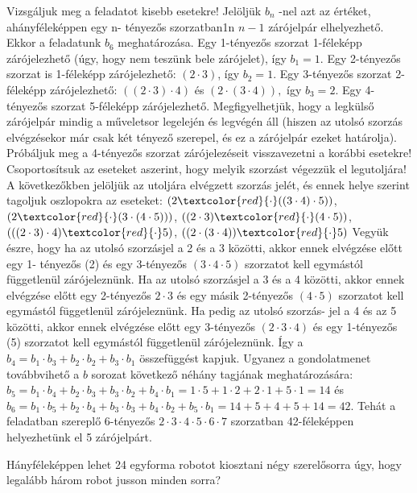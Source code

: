 \begin{solution}
Vizsgáljuk meg a feladatot kisebb esetekre! Jelöljük $b_{n}$ -nel
azt az értéket, ahányféleképpen egy n- tényezős szorzatban1n $n-1$
zárójelpár elhelyezhető. Ekkor a feladatunk $b_{6}$ meghatározása.
Egy 1-tényezős szorzat 1-féleképp zárójelezhető (úgy, hogy nem teszünk
bele zárójelet), így $b_{1}=1.$ Egy 2-tényezős szorzat is 1-féleképp
zárójelezhető: $(2\cdot3)$, így $b_{2}=1.$ Egy 3-tényezős szorzat
2-féleképp zárójelezhető: $((2\cdot3)\cdot4)$ és $(2\cdot(3\cdot4)),$
így $b_{3}=2.$ Egy 4-tényezős szorzat 5-féleképp zárójelezhető. Megfigyelhetjük,
hogy a legkülső zárójelpár mindig a műveletsor legelején és legvégén
áll (hiszen az utolsó szorzás elvégzésekor már csak két tényező szerepel,
és ez a zárójelpár ezeket határolja). Próbáljuk meg a 4-tényezős szorzat
zárójelezéseit visszavezetni a korábbi esetekre! Csoportosítsuk az
eseteket aszerint, hogy melyik szorzást végezzük el legutoljára! A
következőkben jelöljük az utoljára elvégzett szorzás jelét, és ennek
helye szerint tagoljuk oszlopokra az eseteket: $(2\textcolor{red}{\cdot}((3\cdot4)\cdot5))$,
$(2\textcolor{red}{\cdot}(3\cdot(4\cdot5)))$, $((2\cdot3)\textcolor{red}{\cdot}(4\cdot5))$,
$(((2\cdot3)\cdot4)\textcolor{red}{\cdot}5)$, $((2\cdot(3\cdot4))\textcolor{red}{\cdot}5)$
Vegyük észre, hogy ha az utolsó szorzásjel a 2 és a 3 közötti, akkor
ennek elvégzése előtt egy 1- tényezős (2) és egy 3-tényezős $(3\cdot4\cdot5)$
szorzatot kell egymástól függetlenül zárójeleznünk. Ha az utolsó szorzásjel
a 3 és a 4 közötti, akkor ennek elvégzése előtt egy 2-tényezős $2\cdot3$
és egy másik 2-tényezős $(4\cdot5)$ szorzatot kell egymástól függetlenül
zárójeleznünk. Ha pedig az utolsó szorzás- jel a 4 és az 5 közötti,
akkor ennek elvégzése előtt egy 3-tényezős $(2\cdot3\cdot4)$ és egy
1-tényezős (5) szorzatot kell egymástól függetlenül zárójeleznünk.
Így a $b_{4}=b_{1}\cdot b_{3}+b_{2}\cdot b_{2}+b_{3}\cdot b_{1}$
összefüggést kapjuk. Ugyanez a gondolatmenet továbbvihető a $b$ sorozat
következő néhány tagjának meghatározására: $b_{5}=b_{1}\cdot b_{4}+b_{2}\cdot b_{3}+b_{3}\cdot b_{2}+b_{4}\cdot b_{1}=1\cdot5+1\cdot2+2\cdot1+5\cdot1=14$
és $b_{6}=b_{1}\cdot b_{5}+b_{2}\cdot b_{4}+b_{3}\cdot b_{3}+b_{4}\cdot b_{2}+b_{5}\cdot b_{1}=14+5+4+5+14=42.$
Tehát a feladatban szereplő 6-tényezős $2\cdot3\cdot4\cdot5\cdot6\cdot7$
szorzatban 42-féleképpen helyezhetünk el 5 zárójelpárt. 
\end{solution}
\begin{extraproblem}
Hányféleképpen lehet 24 egyforma robotot kiosztani négy szerelősorra
úgy, hogy legalább három robot jusson minden sorra? 
\end{extraproblem}

